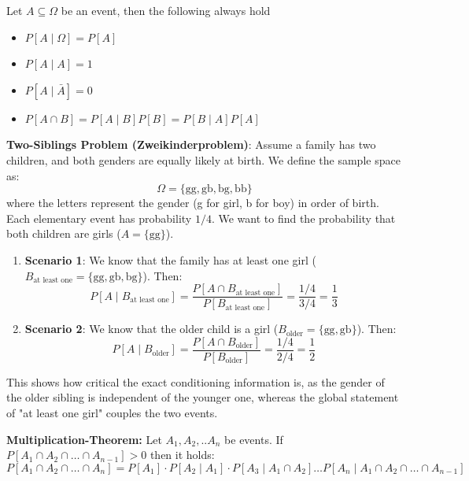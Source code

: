 \begin{remark}
    Let $A \subseteq \Omega$ be an event, then the following always hold
    \begin{itemize}
        \item $P[A \mid \Omega] = P[A]$
        \item $P[A \mid A] = 1$
        \item $P[A \mid \bar{A}] = 0$
        \item $P[A \cap B] = P[A \mid B] P[B] = P[B \mid A] P[A]$
    \end{itemize}
\end{remark}

\begin{example}
    \textbf{Two-Siblings Problem (Zweikinderproblem)}:
    Assume a family has two children, and both genders are equally likely at birth. We define the sample space as:
    $$\Omega = \{ \text{gg}, \text{gb}, \text{bg}, \text{bb} \}$$
    where the letters represent the gender (g for girl, b for boy) in order of birth. Each elementary event has probability $1/4$.
    We want to find the probability that both children are girls ($A = \{ \text{gg} \}$).
    
    \begin{enumerate}
        \item \textbf{Scenario 1}: We know that the family has at least one girl ($B_{\text{at least one}} = \{ \text{gg}, \text{gb}, \text{bg} \}$). Then:
        $$P[A \mid B_{\text{at least one}}] = \frac{P[A \cap B_{\text{at least one}}]}{P[B_{\text{at least one}}]} = \frac{1/4}{3/4} = \frac{1}{3}$$
        \item \textbf{Scenario 2}: We know that the older child is a girl ($B_{\text{older}} = \{ \text{gg}, \text{gb} \}$). Then:
        $$P[A \mid B_{\text{older}}] = \frac{P[A \cap B_{\text{older}}]}{P[B_{\text{older}}]} = \frac{1/4}{2/4} = \frac{1}{2}$$
    \end{enumerate}
    This shows how critical the exact conditioning information is, as the gender of the older sibling is independent of the younger one, whereas the global statement of "at least one girl" couples the two events.
\end{example}

\begin{theorem}
    \textbf{Multiplication-Theorem: } Let $A_1, A_2, .. A_n$ be events. If $P[A_1 \cap A_2 \cap \dots \cap A_{n-1}] > 0$ then it holds:
    $$P[A_1 \cap A_2 \cap \dots \cap A_n] = P[A_1] \cdot P[A_2 \mid A_1] \cdot P[A_3 \mid A_1 \cap A_2] \dots P[A_n \mid A_1 \cap A_2 \cap \dots \cap A_{n-1}]$$
    
\end{theorem}

